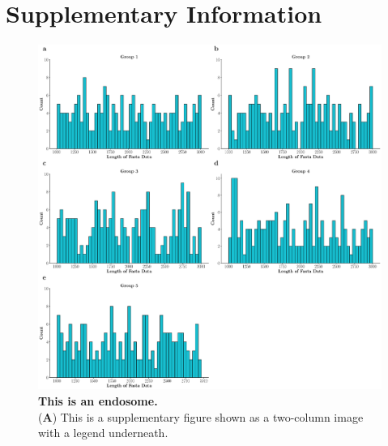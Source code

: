 \onecolumn %
\fancyhead{} %
\renewcommand{\floatpagefraction}{0.1}
\lfoot[\bSupInf]{\dAuthor}
\rfoot[\dAuthor]{\cSupInf}
\newpage

\captionsetup*{format=largeformat} %
\setcounter{figure}{0} %
\setcounter{equation}{0} %
\setcounter{table}{0} %
\setcounter{page}{1} %
\makeatletter
\renewcommand{\thefigure}{S\@arabic\c@figure} %
\renewcommand{\thetable}{S\@arabic\c@table} %
\makeatother
\def\theequation{S\arabic{equation}}


\newpage
\section*{Supplementary Information}\label{sec:supplementary-information}

\begin{figure}[!ht]
	\centering
	\includegraphics[width=\linewidth]{figures/fas_len.eps}
	\caption{\textbf{This is an endosome.}\\
		(\textbf{A}) This is a supplementary figure shown as a two-column image with a legend underneath.}
	\label{suppfig:endosome}
\end{figure}








